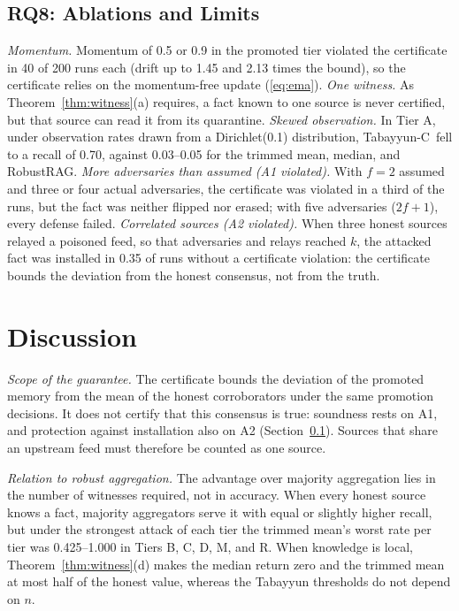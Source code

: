 \documentclass[journal]{IEEEtran}
\theoremstyle{remark}
\newcommand{\TabC}{\mbox{Tabayyun-C}}
\begin{document}
\subsection{RQ8: Ablations and Limits}\label{sec:limits}
\emph{Momentum.} Momentum of 0.5 or 0.9 in the promoted tier violated the certificate in 40 of 200 runs each (drift up to 1.45 and 2.13 times the bound), so the certificate relies on the momentum-free update (\ref{eq:ema}). \emph{One witness.} As Theorem~\ref{thm:witness}(a) requires, a fact known to one source is never certified, but that source can read it from its quarantine. \emph{Skewed observation.} In Tier A, under observation rates drawn from a Dirichlet(0.1) distribution, \TabC\ fell to a recall of 0.70, against 0.03--0.05 for the trimmed mean, median, and RobustRAG. \emph{More adversaries than assumed (A1 violated).} With $f=2$ assumed and three or four actual adversaries, the certificate was violated in a third of the runs, but the fact was neither flipped nor erased; with five adversaries ($2f+1$), every defense failed. \emph{Correlated sources (A2 violated).} When three honest sources relayed a poisoned feed, so that adversaries and relays reached $k$, the attacked fact was installed in 0.35 of runs without a certificate violation: the certificate bounds the deviation from the honest consensus, not from the truth.

\section{Discussion}\label{sec:discussion}
\emph{Scope of the guarantee.} The certificate bounds the deviation of the promoted memory from the mean of the honest corroborators under the same promotion decisions. It does not certify that this consensus is true: soundness rests on A1, and protection against installation also on A2 (Section~\ref{sec:limits}). Sources that share an upstream feed must therefore be counted as one source.

\emph{Relation to robust aggregation.} The advantage over majority aggregation lies in the number of witnesses required, not in accuracy. When every honest source knows a fact, majority aggregators serve it with equal or slightly higher recall, but under the strongest attack of each tier the trimmed mean's worst rate per tier was 0.425--1.000 in Tiers B, C, D, M, and R. When knowledge is local, Theorem~\ref{thm:witness}(d) makes the median return zero and the trimmed mean at most half of the honest value, whereas the Tabayyun thresholds do not depend on $n$.
\end{document}
